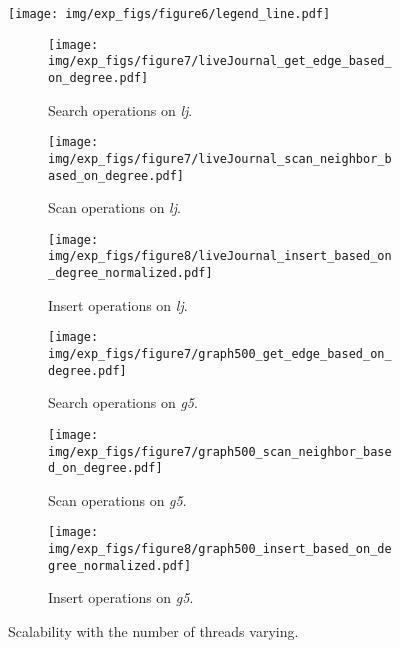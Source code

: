 \begin{figure}[h]
    \setlength{\abovecaptionskip}{0pt}
    \setlength{\belowcaptionskip}{0pt}
    \captionsetup[subfigure]{aboveskip=0pt,belowskip=0pt}
    \centering
    \texttt{[image: img/exp\_figs/figure6/legend\_line.pdf]}\\
    \begin{subfigure}[t]{0.30\textwidth}
        \centering
        \texttt{[image: img/exp\_figs/figure7/liveJournal\_get\_edge\_based\_on\_degree.pdf]}
        \caption{Search operations on \emph{lj}.}
        \label{fig:scalability_search_on_lj}
    \end{subfigure}
    \begin{subfigure}[t]{0.30\textwidth}
        \centering
        \texttt{[image: img/exp\_figs/figure7/liveJournal\_scan\_neighbor\_based\_on\_degree.pdf]}
        \caption{Scan operations on \emph{lj}.}
        \label{fig:scalability_scan_on_lj}
    \end{subfigure}
    \begin{subfigure}[t]{0.30\textwidth}
        \centering
        \texttt{[image: img/exp\_figs/figure8/liveJournal\_insert\_based\_on\_degree\_normalized.pdf]}
        \caption{Insert operations on \emph{lj}.}
        \label{fig:scalability_insert_on_lj}
     \end{subfigure}
    \begin{subfigure}[t]{0.30\textwidth}
        \centering
        \texttt{[image: img/exp\_figs/figure7/graph500\_get\_edge\_based\_on\_degree.pdf]}
        \caption{Search operations on \emph{g5}.}
        \label{fig:scalability_search_on_g5}
    \end{subfigure}
    \begin{subfigure}[t]{0.30\textwidth}
        \centering
        \texttt{[image: img/exp\_figs/figure7/graph500\_scan\_neighbor\_based\_on\_degree.pdf]}
        \caption{Scan operations on \emph{g5}.}
        \label{fig:scalability_scan_on_g5}
    \end{subfigure}
     \begin{subfigure}[t]{0.30\textwidth}
        \centering
        \texttt{[image: img/exp\_figs/figure8/graph500\_insert\_based\_on\_degree\_normalized.pdf]}
        \caption{Insert operations on \emph{g5}.}
        \label{fig:scalability_insert_on_g5}
    \end{subfigure}
    
	\caption{Scalability with the number of threads varying.}
	\label{fig:scalability}
\end{figure}

